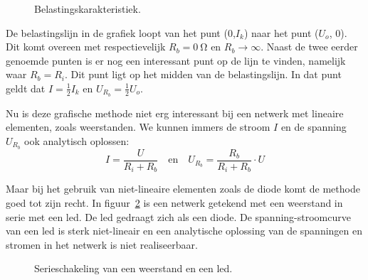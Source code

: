\begin{figure}[!ht]
\centering
{}
\caption{Belastingskarakteristiek.}
\label{fig:gelbelastingskarakteristiek}
\end{figure}

De belastingslijn in de grafiek loopt van het punt (0,$I_k$) naar het punt ($U_o$, 0). Dit komt overeen
met respectievelijk $R_b=\SI{0}{\ohm}$ en $R_b\rightarrow\infty$.
Naast de twee eerder genoemde punten is er nog een interessant punt op de lijn te vinden, namelijk
waar $R_b=R_i$. Dit punt ligt op het midden van de belastingslijn. In dat punt geldt dat $I=\frac{1}{2}I_k$
en $U_{R_b}=\frac{1}{2}U_o$.

Nu is deze grafische methode niet erg interessant bij een netwerk met lineaire elementen, zoals weerstanden.
We kunnen immers de stroom $I$ en de spanning $U_{R_b}$ ook analytisch oplossen:
%
\begin{equation}
I = \dfrac{U}{R_i+R_b} \quad \text{en} \quad U_{R_b} = \dfrac{R_b}{R_i+R_b}\cdot U
\end{equation}

Maar bij het gebruik van niet-lineaire elementen zoals de diode komt de methode goed tot zijn recht.
In figuur~\ref{fig:gelserieweerstandenled} is een netwerk getekend met een weerstand in serie met een
led. De led gedraagt zich als een diode. De spanning-stroomcurve van een led is sterk niet-lineair en een
analytische oplossing van de spanningen en stromen in het netwerk is niet realiseerbaar.

\begin{figure}[H]
\centering
{}
\caption{Serieschakeling van een weerstand en een led.}
\label{fig:gelserieweerstandenled}
\end{figure}

